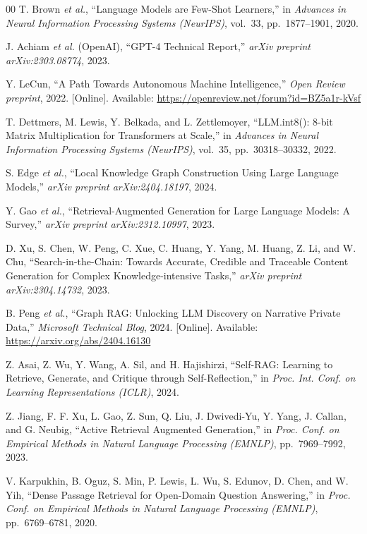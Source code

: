 \documentclass[conference]{IEEEtran}
\begin{document}
\begin{thebibliography}{00}
T. Brown \textit{et al.},
``Language Models are Few-Shot Learners,''
in \textit{Advances in Neural Information Processing Systems (NeurIPS)},
vol.~33, pp.~1877--1901, 2020.

J. Achiam \textit{et al.} (OpenAI),
``{GPT-4} Technical Report,''
\textit{arXiv preprint arXiv:2303.08774}, 2023.

Y. LeCun,
``A Path Towards Autonomous Machine Intelligence,''
\textit{Open Review preprint}, 2022.
[Online]. Available: \url{https://openreview.net/forum?id=BZ5a1r-kVsf}

T. Dettmers, M. Lewis, Y. Belkada, and L. Zettlemoyer,
``{LLM.int8()}: 8-bit Matrix Multiplication for Transformers at Scale,''
in \textit{Advances in Neural Information Processing Systems (NeurIPS)},
vol.~35, pp.~30318--30332, 2022.

S. Edge \textit{et al.},
``Local Knowledge Graph Construction Using Large Language Models,''
\textit{arXiv preprint arXiv:2404.18197}, 2024.

Y. Gao \textit{et al.},
``Retrieval-Augmented Generation for Large Language Models: A Survey,''
\textit{arXiv preprint arXiv:2312.10997}, 2023.

D. Xu, S. Chen, W. Peng, C. Xue, C. Huang, Y. Yang, M. Huang, Z. Li,
and W. Chu,
``Search-in-the-Chain: Towards Accurate, Credible and Traceable
Content Generation for Complex Knowledge-intensive Tasks,''
\textit{arXiv preprint arXiv:2304.14732}, 2023.

B. Peng \textit{et al.},
``Graph {RAG}: Unlocking {LLM} Discovery on Narrative Private Data,''
\textit{Microsoft Technical Blog}, 2024.
[Online]. Available: \url{https://arxiv.org/abs/2404.16130}

Z. Asai, Z. Wu, Y. Wang, A. Sil, and H. Hajishirzi,
``Self-{RAG}: Learning to Retrieve, Generate, and Critique through
Self-Reflection,''
in \textit{Proc. Int. Conf. on Learning Representations (ICLR)}, 2024.

Z. Jiang, F. F. Xu, L. Gao, Z. Sun, Q. Liu, J. Dwivedi-Yu, Y. Yang,
J. Callan, and G. Neubig,
``Active Retrieval Augmented Generation,''
in \textit{Proc. Conf. on Empirical Methods in Natural Language Processing
(EMNLP)}, pp.~7969--7992, 2023.

V. Karpukhin, B. Oguz, S. Min, P. Lewis, L. Wu, S. Edunov, D. Chen,
and W. Yih,
``Dense Passage Retrieval for Open-Domain Question Answering,''
in \textit{Proc. Conf. on Empirical Methods in Natural Language Processing
(EMNLP)}, pp.~6769--6781, 2020.


\end{thebibliography}
\end{document}
